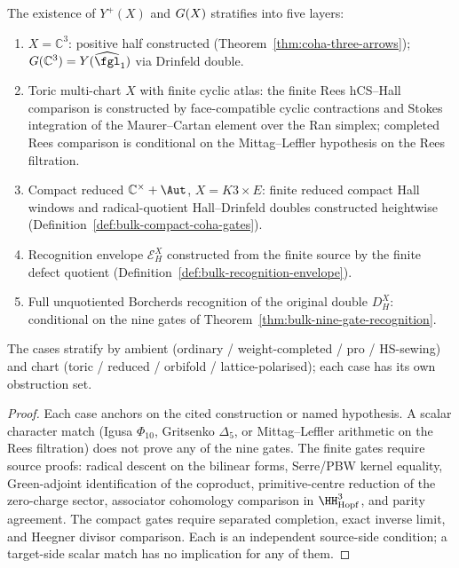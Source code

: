 \begin{theorem}
\label{thm:bulk-five-case-answer}
The existence of $Y^{+}(X)$ and $G(X)$ stratifies
into five layers:
\begin{enumerate}[label=\textup{(C\arabic*)},leftmargin=2.4em,itemsep=2pt]
\item $X = \mathbb C^3$: positive half constructed
(Theorem~\ref{thm:coha-three-arrows});
$\Gquant(\mathbb C^3) = Y(\widehat{\fgl}_1)$ via Drinfeld double.
\item Toric multi-chart $X$ with finite cyclic atlas: the finite
Rees hCS--Hall comparison is constructed by face-compatible cyclic
contractions and Stokes integration of the Maurer--Cartan element
over the Ran simplex; completed Rees comparison is conditional on
the Mittag--Leffler hypothesis on the Rees filtration.
\item Compact reduced $\mathbb C^{\times} + \Aut$, $X = K3 \times E$:
finite reduced compact Hall windows and radical-quotient
Hall--Drinfeld doubles constructed heightwise (Definition~\ref{def:bulk-compact-coha-gates}).
\item Recognition envelope $\mathcal E_{H}^{X}$ constructed from the
finite source by the finite defect quotient
(Definition~\ref{def:bulk-recognition-envelope}).
\item Full unquotiented Borcherds recognition of the original double
$D_{H}^{X}$: conditional on the nine gates of
Theorem~\ref{thm:bulk-nine-gate-recognition}.
\end{enumerate}
The cases stratify by ambient (ordinary / weight-completed / pro / HS-sewing)
and chart (toric / reduced / orbifold / lattice-polarised); each case has
its own obstruction set.
\end{theorem}

\begin{proof}
Each case anchors on the cited construction or named hypothesis.
A scalar character match (Igusa $\Phi_{10}$, Gritsenko $\Delta_{5}$,
or Mittag--Leffler arithmetic on the Rees filtration) does not prove
any of the nine gates. The finite gates require source proofs:
radical descent on the bilinear forms, Serre/PBW kernel equality,
Green-adjoint identification of the coproduct, primitive-centre
reduction of the zero-charge sector, associator cohomology comparison
in $\HH^{3}_{\mathrm{Hopf}}$, and parity agreement. The compact gates
require separated completion, exact inverse limit, and Heegner divisor
comparison. Each is an independent source-side condition; a target-side
scalar match has no implication for any of them.
\end{proof}

